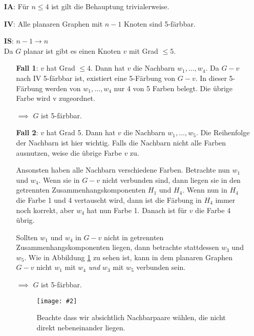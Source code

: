 \documentclass[10pt,a4paper]{article}
\makeatletter
\def\maxwidth#1{\ifdim\Gin@nat@width>#1 #1\else\Gin@nat@width\fi}
\newcommand{\imageFigure}[4]{%
    \begin{figure}[h]%
        \centering%
        {%
            \setlength{\fboxsep}{1pt}%
            \setlength{\fboxrule}{1pt}%
            \texttt{[image: \#2]}%
        }%
        \caption{#1}%
        \label{fig:#4}%
    \end{figure}%
}
\makeatother
\begin{document}
\begin{itemize}
    \item[\textbf{IA}:] Für $n \leq 4$ ist gilt die Behauptung trivialerweise.

    \item[\textbf{IV}:] Alle planaren Graphen mit $n-1$ Knoten sind 5-färbbar.

    \item[\textbf{IS}:] $n-1 \rightarrow n$\\ Da $G$ planar ist gibt es einen
        Knoten $v$ mit Grad $\leq 5$.

        \begin{itemize}
            \item[\textbf{Fall 1}:] $v$ hat Grad $\leq 4$.
                Dann hat $v$ die Nachbarn $w_1, \dots, w_4$.
                Da $G-v$ nach IV 5-färbbar ist, existiert eine 5-Färbung von
                $G-v$.
                In dieser 5-Färbung werden von $w_1, \dots,w_4$ nur 4 von 5
                Farben belegt.
                Die übrige Farbe wird v zugeordnet.

                $\implies$ $G$ ist 5-färbbar.
            \item[\textbf{Fall 2}:] $v$ hat Grad 5.
                Dann hat $v$ die Nachbarn $w_1, \dots, w_5$.
                Die Reihenfolge der Nachbarn ist hier wichtig.
                Falls die Nachbarn nicht alle Farben ausnutzen, weise die
                übrige Farbe $v$ zu.

                Ansonsten haben alle Nachbarn verschiedene Farben.
                Betrachte nun $w_1$ und $w_4$.
                Wenn sie in $G-v$ nicht verbunden sind, dann liegen sie in den
                getrennten Zusammenhangskomponenten $H_1$ und $H_4$.
                Wenn nun in $H_4$ die Farbe 1 und 4 vertauscht wird, dann ist
                die Färbung in $H_4$ immer noch korrekt, aber $w_4$ hat nun
                Farbe 1.
                Danach ist für $v$ die Farbe 4 übrig.

                Sollten $w_1$ und $w_4$ in $G-v$ nicht in getrennten
                Zusammenhangskomponenten liegen, dann betrachte stattdessen
                $w_3$ und $w_5$.
                Wie in Abbildung \ref{fig:color} zu sehen ist, kann in dem
                planaren Graphen $G-v$ nicht $w_1$ mit $w_4$ \textit{und} $w_3$
                mit $w_5$ verbunden sein.

                $\implies$ $G$ ist 5-färbbar.

                \imageFigure{Beachte dass wir absichtlich Nachbarpaare wählen,
                die nicht direkt nebeneinander liegen.}{color.png}{.25}{color}
        \end{itemize}
\end{itemize}
\end{document}
